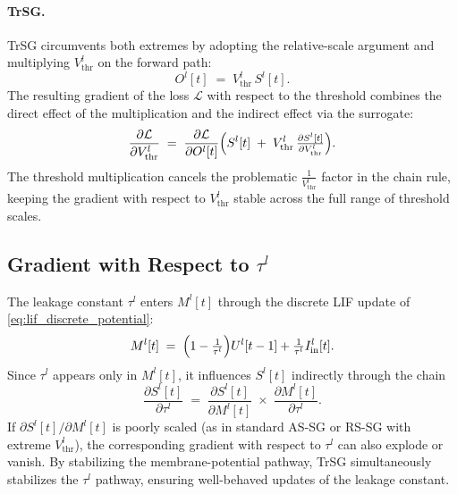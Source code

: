 \paragraph{TrSG.}
TrSG circumvents both extremes by adopting the relative-scale argument and multiplying $V^{l}_{\text{thr}}$ on the forward path:
\begin{equation}
O^{l}[t] \;=\; V^{l}_{\text{thr}}\,S^{l}[t].
\end{equation}
The resulting gradient of the loss $\mathcal{L}$ with respect to the threshold combines the direct effect of the multiplication and the indirect effect via the surrogate:
\begin{equation}
\frac{\partial \mathcal{L}}{\partial V^{l}_{\text{thr}}}
\;=\;
\frac{\partial \mathcal{L}}{\partial O^{l}[t]}
\Bigl(S^{l}[t] \;+\; V^{l}_{\text{thr}}\,\tfrac{\partial S^{l}[t]}{\partial V^{l}_{\text{thr}}}\Bigr).
\end{equation}
The threshold multiplication cancels the problematic $\tfrac{1}{V^{l}_{\text{thr}}}$ factor in the chain rule, keeping the gradient with respect to $V^{l}_{\text{thr}}$ stable across the full range of threshold scales.

\subsection{Gradient with Respect to \texorpdfstring{$\tau^{l}$}{tau}}
\label{subsec:trsg_grad_tau}

The leakage constant $\tau^{l}$ enters $M^{l}[t]$ through the discrete LIF update of \cref{eq:lif_discrete_potential}:
\begin{equation}
M^{l}[t] \;=\; \Bigl(1-\tfrac{1}{\tau^{l}}\Bigr) U^{l}[t-1] + \tfrac{1}{\tau^{l}} I^{l}_{\text{in}}[t].
\end{equation}
Since $\tau^{l}$ appears only in $M^{l}[t]$, it influences $S^{l}[t]$ indirectly through the chain
\begin{equation}
\frac{\partial S^{l}[t]}{\partial \tau^{l}}
\;=\;
\frac{\partial S^{l}[t]}{\partial M^{l}[t]}
\;\times\;
\frac{\partial M^{l}[t]}{\partial \tau^{l}}.
\end{equation}
If $\partial S^{l}[t]/\partial M^{l}[t]$ is poorly scaled (as in standard AS-SG or RS-SG with extreme $V^{l}_{\text{thr}}$), the corresponding gradient with respect to $\tau^{l}$ can also explode or vanish. By stabilizing the membrane-potential pathway, TrSG simultaneously stabilizes the $\tau^{l}$ pathway, ensuring well-behaved updates of the leakage constant.

